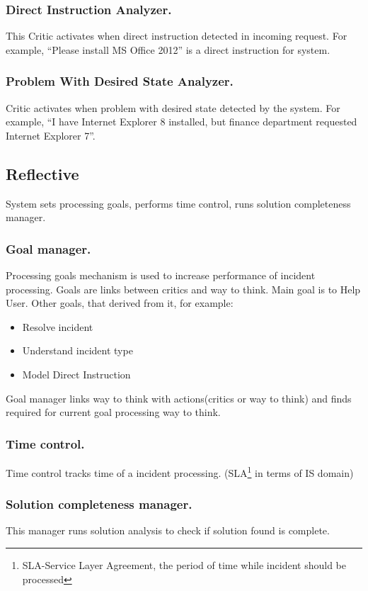 \documentclass[runningheads,a4paper]{llncs}
\begin{document}
\subsubsection{Direct Instruction Analyzer.} This Critic activates when direct instruction detected in incoming request. For example, “Please install MS Office 2012” is a direct instruction for system.
\subsubsection{Problem With Desired State Analyzer.} Critic activates when problem with desired state detected by the system. For example, “I have Internet Explorer 8 installed, but finance department requested Internet Explorer 7”.

\subsection{Reflective}

System sets processing goals, performs time control, runs solution completeness manager.

\subsubsection{Goal manager.} Processing goals mechanism is used to increase performance of incident processing. Goals are links between critics and way to think. Main goal is to Help User. Other goals, that derived from it, for example:
\begin{itemize}
 \item Resolve incident
 \item Understand incident type
 \item Model Direct Instruction
\end{itemize}
Goal manager links way to think with actions(critics or way to think) and finds required for current goal processing way to think.

\subsubsection{Time control.} Time control tracks time of a incident processing. (SLA\footnote{SLA-Service Layer Agreement, the period of time while incident should be processed} in terms of IS domain)

\subsubsection{Solution completeness manager.} This manager runs solution analysis to check if solution found is complete.
\end{document}
